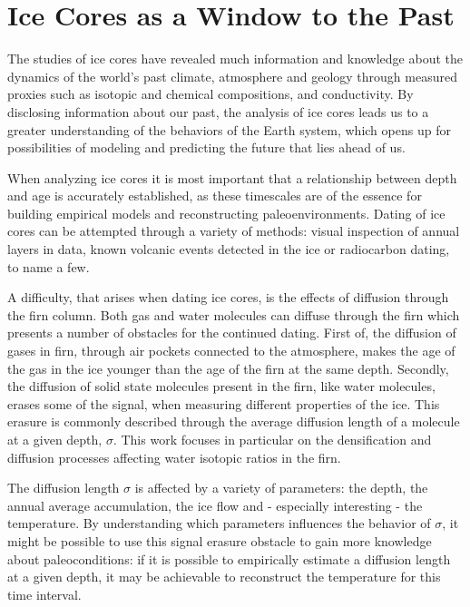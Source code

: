 \documentclass[../../CompleteThesis2/Complete_2ndDraft]{subfiles}
\begin{document}
	
\section[Ice Cores]{Ice Cores as a Window to the Past}
\label{Sec:StudyIceCores}
	
The studies of ice cores have revealed much information and knowledge about the dynamics of the world's past climate, atmosphere and geology through measured proxies such as isotopic and chemical compositions, and conductivity. By disclosing information about our past, the analysis of ice cores leads us to a greater understanding of the behaviors of the Earth system, which opens up for possibilities of modeling and predicting the future that lies ahead of us.
	
When analyzing ice cores it is most important that a relationship between depth and age is accurately established, as these timescales are of the essence for building empirical models and reconstructing paleoenvironments. Dating of ice cores can be attempted through a variety of methods: visual inspection of annual layers in data, known volcanic events detected in the ice or radiocarbon dating, to name a few. 
	
A difficulty, that arises when dating ice cores, is the effects of diffusion through the firn column. Both gas and water molecules can diffuse through the firn which presents a number of obstacles for the continued dating. First of, the diffusion of gases in firn, through air pockets connected to the atmosphere, makes the age of the gas in the ice younger than the age of the firn at the same depth. Secondly, the diffusion of solid state molecules present in the firn, like water molecules, erases some of the signal, when measuring different properties of the ice. This erasure is commonly described through the average diffusion length of a molecule at a given depth, $\sigma$. This work focuses in particular on the densification and diffusion processes affecting water isotopic ratios in the firn.
	
The diffusion length $\sigma$ is affected by a variety of parameters: the depth, the annual average accumulation, the ice flow and - especially interesting - the temperature. By understanding which parameters influences the behavior of $\sigma$, it might be possible to use this signal erasure obstacle to gain more knowledge about paleoconditions: if it is possible to empirically estimate a diffusion length at a given depth, it may be achievable to reconstruct the temperature for this time interval.
	
\end{document}

